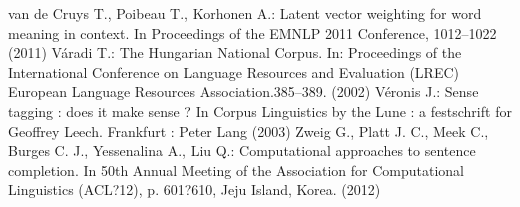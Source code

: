 \documentclass{llncs}
\begin{document}
\begin{thebibliography}{15}
%
van de Cruys T., Poibeau T., Korhonen A.:
Latent vector weighting for word meaning in context.
In Proceedings of the EMNLP 2011 Conference, 1012--1022 (2011)
%
V\'{a}radi T.:
The Hungarian National Corpus.
In: Proceedings of the International Conference on Language Resources and Evaluation (LREC) European Language Resources Association.385--389. (2002)
%
V\'{e}ronis J.:
Sense tagging : does it make sense ? 
In Corpus Linguistics by the Lune : a festschrift for Geoffrey Leech. Frankfurt : Peter Lang (2003)
%
Zweig G., Platt J. C., Meek C., Burges C. J., Yessenalina A., Liu Q.:
Computational approaches to sentence completion.
In 50th Annual Meeting of the Association for Computational Linguistics (ACL?12), p. 601?610, Jeju Island, Korea. (2012)

\end{thebibliography}
\end{document}
